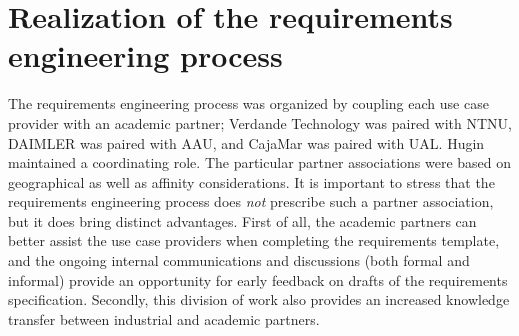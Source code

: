 
\section{Realization of the requirements engineering process}
\label{sec:realization}

The requirements engineering process was organized by coupling each use case provider with an
academic partner; Verdande Technology was paired with NTNU, DAIMLER was paired with AAU, and CajaMar was paired with
UAL. Hugin maintained a coordinating role. The particular partner associations were based on geographical as well as affinity
considerations. It is important to stress that the requirements engineering process does \emph{not} prescribe such a
partner association, but it does bring distinct advantages. First of all, the academic partners can better assist the use case
providers when completing the requirements template, and the ongoing internal communications and discussions (both formal
and informal) provide an opportunity for early feedback on drafts of the requirements
specification. Secondly, this division of work also provides an increased knowledge transfer between industrial and academic
partners. 





